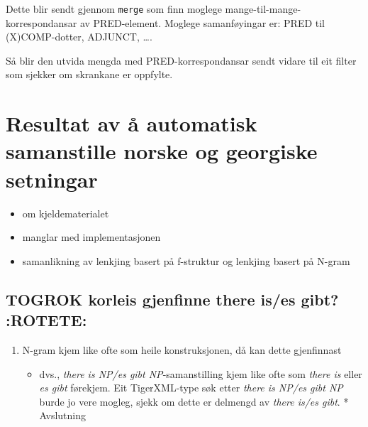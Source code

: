 \documentclass[11pt,a4paper,oneside,draft]{book}
\begin{document}
Dette blir sendt gjennom \texttt{merge} som finn moglege
mange-til-mange-korrespondansar av PRED-element. Moglege samanføyingar
er: PRED til (X)COMP-dotter, ADJUNCT, \ldots{}.

Så blir den utvida mengda med PRED-korrespondansar sendt vidare til
eit filter som sjekker om skrankane er oppfylte.

\chapter{Resultat av å automatisk samanstille norske og georgiske setningar}
\label{sec-5}

\begin{itemize}
\item om kjeldematerialet
\item manglar med implementasjonen
\item samanlikning av lenkjing basert på f-struktur og lenkjing basert
     på N-gram
\end{itemize}
\section{\textbf{TOGROK} korleis gjenfinne there is/es gibt? \textbf{:ROTETE:}}
\label{sec-5.1}

\begin{enumerate}
\item N-gram kjem like ofte som heile konstruksjonen, då kan dette
   gjenfinnast

\begin{itemize}
\item dvs., \emph{there is NP/es gibt NP}-samanstilling kjem like ofte som
     \emph{there is} eller \emph{es gibt} førekjem. Eit TigerXML-type søk etter
     \emph{there is NP/es gibt NP} burde jo vere mogleg, sjekk om dette er
     delmengd av \emph{there is/es gibt}. * Avslutning
\end{itemize}

\end{enumerate}


\end{document}
